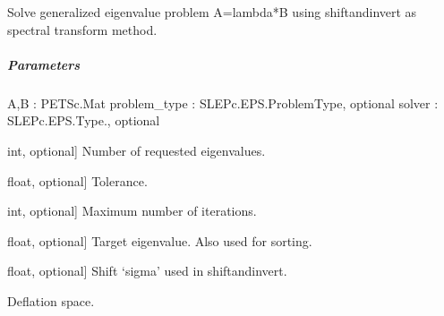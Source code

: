 \documentclass[letterpaper,10pt,english]{sphinxmanual}
\begin{document}
\begin{fulllineitems}
\label{\detokenize{scrimp.utils:scrimp.utils.linalg.solve_GEP_shiftinvert}}
\pysigstartsignatures
\pysiglinewithargsret
{}
{\sphinxparamcomma {}\sphinxparamcomma {}\sphinxparamcomma {}\sphinxparamcomma {}\sphinxparamcomma {}\sphinxparamcomma {}\sphinxparamcomma {}\sphinxparamcomma {}\sphinxparamcomma {}\sphinxparamcomma {}\sphinxparamcomma {}}
{}
\pysigstopsignatures
\sphinxAtStartPar
Solve generalized eigenvalue problem A=lambda*B using shift\sphinxhyphen{}and\sphinxhyphen{}invert
as spectral transform method.


\subparagraph{Parameters}
\label{\detokenize{scrimp.utils:id1}}
\sphinxAtStartPar
A,B : PETSc.Mat
problem\_type : SLEPc.EPS.ProblemType, optional
solver : SLEPc.EPS.Type., optional
\begin{description}
\sphinxlineitem{nev}{[}int, optional{]}
\sphinxAtStartPar
Number of requested eigenvalues.

\sphinxlineitem{tol}{[}float, optional{]}
\sphinxAtStartPar
Tolerance.

\sphinxlineitem{max\_it}{[}int, optional{]}
\sphinxAtStartPar
Maximum number of iterations.

\sphinxlineitem{target}{[}float, optional{]}
\sphinxAtStartPar
Target eigenvalue. Also used for sorting.

\sphinxlineitem{shift}{[}float, optional{]}
\sphinxAtStartPar
Shift ‘sigma’ used in shift\sphinxhyphen{}and\sphinxhyphen{}invert.

\sphinxAtStartPar
Deflation space.


\end{description}
\end{fulllineitems}
\end{document}
